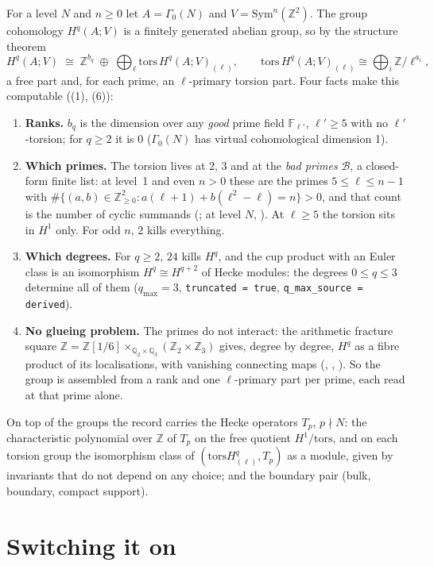 \documentclass[11pt,openany]{report}
\newcommand{\F}{\mathbb{F}}
\newcommand{\Z}{\mathbb{Z}}
\newcommand{\Q}{\mathbb{Q}}
\newcommand{\Sym}{\mathrm{Sym}}
\newcommand{\tors}{\mathrm{tors}}
\begin{document}
For a level $N$ and $n\ge0$ let $A=\Gamma_0(N)$ and $V=\Sym^n(\Z^2)$. The group cohomology $H^q(A;V)$ is a finitely
generated abelian group, so by the structure theorem
\[
  H^q(A;V)\;\cong\;\Z^{b_q}\;\oplus\;\bigoplus_{\ell}\tors\,H^q(A;V)_{(\ell)},\qquad
  \tors\,H^q(A;V)_{(\ell)}\cong\bigoplus_i\Z/\ell^{a_i},
\]
a free part and, for each prime, an $\ell$-primary torsion part. Four facts make this computable
({}(1), (6)):
\begin{enumerate}[nosep]
\item \textbf{Ranks.} $b_q$ is the dimension over any \emph{good} prime field $\F_{\ell'}$, $\ell'\ge5$ with no
  $\ell'$-torsion; for $q\ge2$ it is $0$ ($\Gamma_0(N)$ has virtual cohomological dimension 1).
\item \textbf{Which primes.} The torsion lives at $2$, $3$ and at the \emph{bad primes} $\mathcal B$, a closed-form finite
  list: at level~1 and even $n>0$ these are the primes $5\le\ell\le n-1$ with
  $\#\{(a,b)\in\Z_{\ge0}^2:a(\ell+1)+b(\ell^2-\ell)=n\}>0$, and that count is the number of cyclic summands
  ({}; at level $N$, {}). At $\ell\ge5$ the torsion sits in $H^1$
  only. For odd $n$, $2$ kills everything.
\item \textbf{Which degrees.} For $q\ge2$, $24$ kills $H^q$, and the cup product with an Euler class is an isomorphism
  $H^q\cong H^{q+2}$ of Hecke modules: the degrees $0\le q\le3$ determine all of them ($q_{\max}=3$, \texttt{truncated =
  true}, \texttt{q\_max\_source = derived}).
\item \textbf{No glueing problem.} The primes do not interact: the arithmetic fracture square
  $\Z=\Z[1/6]\times_{\Q_2\times\Q_3}(\Z_2\times\Z_3)$ gives, degree by degree, $H^q$ as a fibre product of its
  localisations, with vanishing connecting maps ({}, {},
  {}). So the group is assembled from a rank and one $\ell$-primary part per prime, each read at
  that prime alone.
\end{enumerate}
On top of the groups the record carries the Hecke operators $T_p$, $p\nmid N$: the characteristic polynomial over $\Z$ of
$T_p$ on the free quotient $H^1/\tors$, and on each torsion group the isomorphism class of $(\tors H^q_{(\ell)}, T_p)$ as a
module, given by invariants that do not depend on any choice; and the boundary pair (bulk, boundary, compact support).

\section{Switching it on}\label{sec:int-switch}
\end{document}
